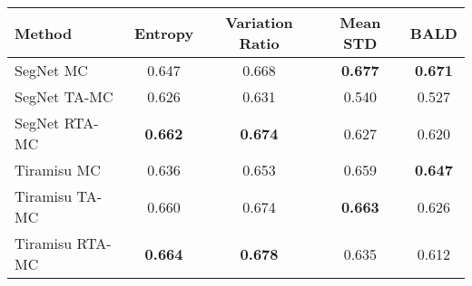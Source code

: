 \begin{table}[t]
\centering
\addtolength{\tabcolsep}{2mm}
\begin{tabular}{lcccc}
\hline
Method & Entropy & Variation Ratio & Mean STD & BALD  \\ 
\hline\hline
SegNet MC   &  0.647  &  0.668  &\textbf{0.677} & \textbf{0.671}\\ 
SegNet TA-MC   &  0.626  &  0.631 & 0.540 & 0.527\\ 
SegNet RTA-MC & \textbf{0.662} & \textbf{0.674} & 0.627 & 0.620\\
\hline\hline
Tiramisu MC   &  0.636  &  0.653  & 0.659 & \textbf{0.647}\\ 
Tiramisu TA-MC   &  0.660 &  0.674 & \textbf{0.663} & 0.626\\ 
Tiramisu RTA-MC & \textbf{0.664} & \textbf{0.678} & 0.635 & 0.612\\
\hline
\end{tabular}
\small \caption{\small {}}
\label{table.frame_rank}
\end{table}






\label{sec.unct}























